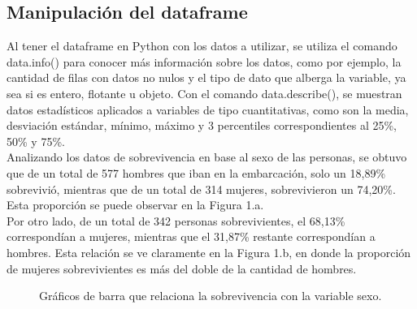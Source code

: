 \documentclass[letter, 10pt]{article}
\begin{document}
\subsection{Manipulación del dataframe}

Al tener el dataframe en Python con los datos a utilizar, se utiliza el comando data.info() para conocer más información sobre los datos, como por ejemplo, la cantidad de filas con datos no nulos y el tipo de dato que alberga la variable, ya sea si es entero, flotante u objeto. Con el comando data.describe(), se muestran datos estadísticos aplicados a variables de tipo cuantitativas, como son la media, desviación estándar, mínimo, máximo y 3 percentiles correspondientes al 25\%, 50\% y 75\%.\\

Analizando los datos de sobrevivencia en base al sexo de las personas, se obtuvo que  de un total de 577 hombres que iban en la embarcación, solo un 18,89\% sobrevivió, mientras que de un total de 314 mujeres, sobrevivieron un 74,20\%. Esta proporción se puede observar en la Figura 1.a.\\

Por otro lado, de un total de 342 personas sobrevivientes, el 68,13\% correspondían a mujeres, mientras que el 31,87\%  restante correspondían a hombres. Esta relación se ve claramente en la Figura 1.b, en donde la proporción de mujeres sobrevivientes es más del doble de la cantidad de hombres.

\begin{figure}[H]
\caption{Gráficos de barra que relaciona la sobrevivencia con la variable sexo.}
\end{figure}
\end{document}
